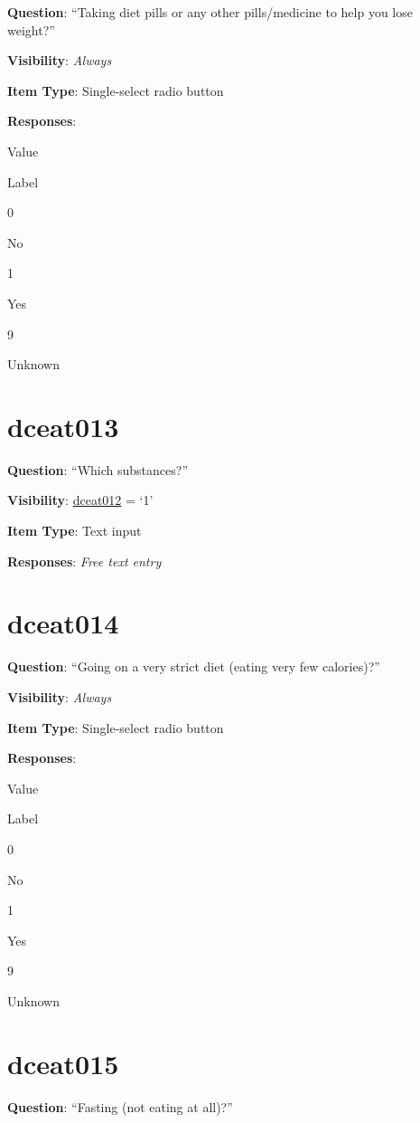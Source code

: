 \documentclass[]{book}
\begin{document}
\textbf{Question}: ``Taking diet pills or any other pills/medicine to help you lose weight?''

\textbf{Visibility}: \emph{Always}

\textbf{Item Type}: Single-select radio button

\textbf{Responses}:

Value

Label

0

No

1

Yes

9

Unknown

\hypertarget{dceat013}{%
\section{dceat013}\label{dceat013}}

\textbf{Question}: ``Which substances?''

\textbf{Visibility}: \protect\hyperlink{dceat012}{dceat012} = `1'

\textbf{Item Type}: Text input

\textbf{Responses}: \emph{Free text entry}

\hypertarget{dceat014}{%
\section{dceat014}\label{dceat014}}

\textbf{Question}: ``Going on a very strict diet (eating very few calories)?''

\textbf{Visibility}: \emph{Always}

\textbf{Item Type}: Single-select radio button

\textbf{Responses}:

Value

Label

0

No

1

Yes

9

Unknown

\hypertarget{dceat015}{%
\section{dceat015}\label{dceat015}}

\textbf{Question}: ``Fasting (not eating at all)?''
\end{document}
